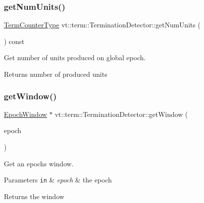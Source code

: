\subsubsection{\texorpdfstring{get\+Num\+Units()}{getNumUnits()}}
{\footnotesize\ttfamily \hyperlink{namespacevt_1_1term_a4fd378cdb0c36683afc1b3399d685f7f}{Term\+Counter\+Type} vt\+::term\+::\+Termination\+Detector\+::get\+Num\+Units (\begin{DoxyParamCaption}{ }\end{DoxyParamCaption}) const}



Get number of units produced on global epoch. 

\begin{DoxyReturn}{Returns}
number of produced units 
\end{DoxyReturn}
\mbox{\label{structvt_1_1term_1_1_termination_detector_a9fb190f8db25f2296025de31dc7df72c}} 
\subsubsection{\texorpdfstring{get\+Window()}{getWindow()}}
{\footnotesize\ttfamily \hyperlink{structvt_1_1term_1_1_epoch_window}{Epoch\+Window} $\ast$ vt\+::term\+::\+Termination\+Detector\+::get\+Window (\begin{DoxyParamCaption}\item[{\hyperlink{namespacevt_a985a5adf291c34a3ca263b3378388236}{Epoch\+Type} const \&}]{epoch }\end{DoxyParamCaption})\hspace{0.3cm}{\ttfamily [private]}}



Get an epoch\textquotesingle{}s window. 


\begin{DoxyParams}[1]{Parameters}
\mbox{\tt in}  & {\em epoch} & the epoch\\
\hline
\end{DoxyParams}
\begin{DoxyReturn}{Returns}
the window 
\end{DoxyReturn}
\mbox{\label{structvt_1_1term_1_1_termination_detector_af9fd292c8d1bcc5eba9ee1fb39c29ea2}} 
